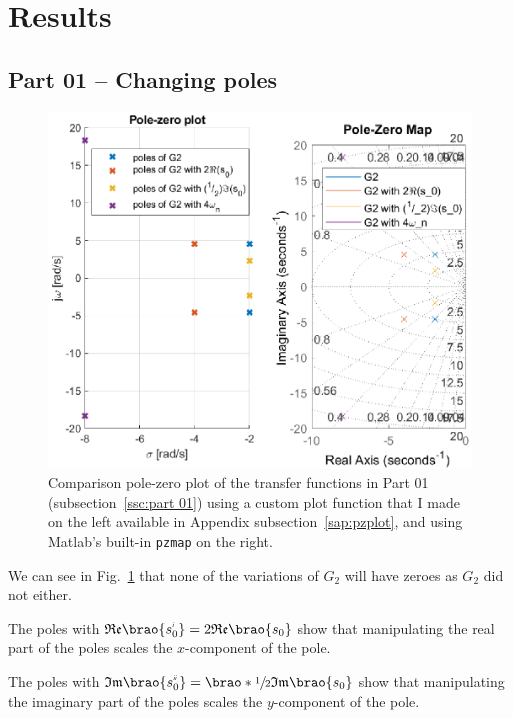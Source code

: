 \documentclass[12pt]{article}
\DeclarePairedDelimiter\brao()%
\newcommand{\setprime}[2][1]{%
    {#2}^{%
        \raisebox{1pt}{%
            \scalebox{0.5}{%
                \itshape\sffamily\uppercase%
                \expandafter{%
                    \romannumeral#1%
                }%
            }%
        }
    }%
}%
\begin{document}
\section{Results}

\subsection{Part 01 -- Changing poles}

\begin{figure}
    \centering
    \includegraphics[width=\linewidth]{img/part01_pzplot_pzmap.eps}
    \caption{Comparison pole-zero plot of the transfer functions in Part 01 (subsection~\ref{ssc:part 01}) using a custom plot function that I made on the left available in Appendix subsection~\ref{sap:pzplot}, and using Matlab's built-in \texttt{pzmap} on the right.}
    \label{fig:part01_pzplot_pzmap}
\end{figure}

We can see in Fig.~\ref{fig:part01_pzplot_pzmap} that none of the variations of $G_2$ will have zeroes as $G_2$ did not either.

The poles with $\mathfrak{Re}\brao{\setprime{s}_0} = 2\mathfrak{Re}\brao{s_0}$ show that manipulating the real part of the poles scales the $x$-component of the pole.

The poles with $\mathfrak{Im}\brao{\setprime[2]s_0} = \brao*{\sfrac12}\mathfrak{Im}\brao{s_0}$ show that manipulating the imaginary part of the poles scales the $y$-component of the pole.
\end{document}
